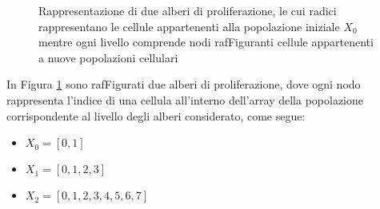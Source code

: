 \begin{figure}[t]
    \begin{minipage}[b]{.5\linewidth}
    \centering
    \end{minipage}
    \begin{minipage}[b]{.5\linewidth}
    \centering
    \end{minipage}
    \caption{Rappresentazione di due alberi di proliferazione, le cui radici
        rappresentano le cellule appartenenti alla popolazione iniziale $X_{0}$
        mentre ogni livello comprende nodi rafFiguranti cellule appartenenti
        a nuove popolazioni cellulari}
    \label{fig:prolif-tree}
\end{figure}
In Figura \ref{fig:prolif-tree} sono rafFigurati due alberi di proliferazione,
dove ogni nodo
rappresenta l'indice di una cellula all'interno dell'array della popolazione
corrispondente al livello degli alberi considerato, come segue:

\begin{itemize}
    \item $X_{0} = [0, 1]$
    \item $X_{1} = [0, 1, 2, 3]$
    \item $X_{2} = [0, 1, 2, 3, 4, 5, 6, 7]$    
\end{itemize}

